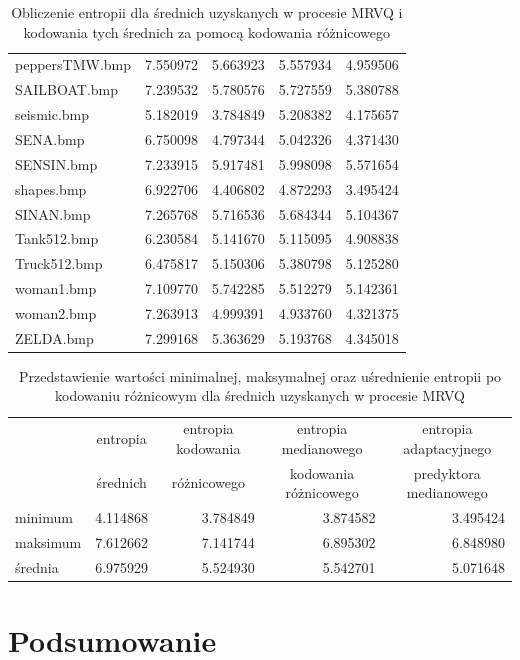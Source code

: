 \documentclass{article}
\begin{document}
\begin{table}
\begin{tabular}{lrrrr}
        peppersTMW.bmp &  7.550972 &  5.663923 &  5.557934 &  4.959506 \\
          SAILBOAT.bmp &  7.239532 &  5.780576 &  5.727559 &  5.380788 \\
           seismic.bmp &  5.182019 &  3.784849 &  5.208382 &  4.175657 \\
              SENA.bmp &  6.750098 &  4.797344 &  5.042326 &  4.371430 \\
            SENSIN.bmp &  7.233915 &  5.917481 &  5.998098 &  5.571654 \\
            shapes.bmp &  6.922706 &  4.406802 &  4.872293 &  3.495424 \\
             SINAN.bmp &  7.265768 &  5.716536 &  5.684344 &  5.104367 \\
       Tank512.bmp &  6.230584 &  5.141670 &  5.115095 &  4.908838 \\
      Truck512.bmp &  6.475817 &  5.150306 &  5.380798 &  5.125280 \\
        woman1.bmp &  7.109770 &  5.742285 &  5.512279 &  5.142361 \\
        woman2.bmp &  7.263913 &  4.999391 &  4.933760 &  4.321375 \\
         ZELDA.bmp &  7.299168 &  5.363629 &  5.193768 &  4.345018 \\
    \bottomrule
    \end{tabular}
    \caption{Obliczenie entropii dla średnich uzyskanych w procesie MRVQ i kodowania tych średnich za pomocą kodowania różnicowego}
    \label{tab:differential_encoding_all}
\end{table}

\begin{table}[H]
    \centering
    \begin{tabular}{lrrrr}
    \toprule
        {} & \multicolumn{1}{c}{entropia} & \multicolumn{1}{c}{entropia kodowania} & \multicolumn{1}{c}{entropia medianowego} & \multicolumn{1}{c}{entropia adaptacyjnego} \\
        {} & \multicolumn{1}{c}{średnich} & \multicolumn{1}{c}{różnicowego} & \multicolumn{1}{c}{kodowania różnicowego} & \multicolumn{1}{c}{predyktora medianowego} \\
    \midrule
        minimum & 4.114868 & 3.784849 &	3.874582 &	3.495424 \\
        maksimum & 7.612662 &	7.141744 &	6.895302 &	6.848980 \\
        średnia & 6.975929 &	5.524930 &	5.542701 &	5.071648 \\
    \bottomrule
    \end{tabular}

        \caption{Przedstawienie wartości minimalnej, maksymalnej oraz uśrednienie entropii po kodowaniu różnicowym dla średnich uzyskanych w procesie MRVQ}
        \label{tab:differential_encoding_summary}
    \end{table}

\section{Podsumowanie}

\lipsum[1-3]

  
\end{document}
